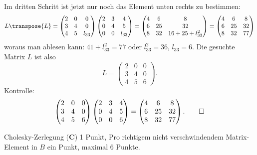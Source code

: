 \begin{loesung}
Im dritten Schritt ist jetzt nur noch das Element unten rechts zu bestimmen:
\[
L\transpose{L}=
\begin{pmatrix}
2&0&     0\\
3&4&     0\\
4&5&l_{33}
\end{pmatrix}
\begin{pmatrix}
2&3&     4\\
0&4&     5\\
0&0&l_{33}
\end{pmatrix}
=
\begin{pmatrix}
 4& 6&  8\\
 6&25& 32\\
 8&32&16+25+l_{33}^2
\end{pmatrix}
=
\begin{pmatrix}
 4& 6& 8\\
 6&25&32\\
 8&32&77
\end{pmatrix}
\]
woraus man ablesen kann: $41+l_{33}^2=77$ oder $l_{33}^2=36$, $l_{33}=6$.
Die gesuchte Matrix $L$ ist also
\[
L=
\begin{pmatrix}
2&0&0\\
3&4&0\\
4&5&6
\end{pmatrix}.
\]
Kontrolle:
\[
\begin{pmatrix}
2&0&0\\
3&4&0\\
4&5&6
\end{pmatrix}
\begin{pmatrix}
2&3&4\\
0&4&5\\
0&0&6
\end{pmatrix}
=
\begin{pmatrix}
 4& 6&  8\\
 6&25& 32\\
 8&32& 77
\end{pmatrix}.
\qedhere
\]
\end{loesung}

\begin{bewertung}
Cholesky-Zerlegung ({\bf C}) 1 Punkt,
Pro richtigem nicht verschwindendem Matrix-Element in $B$ ein Punkt,
maximal 6 Punkte.
\end{bewertung}

